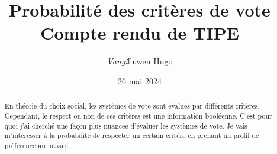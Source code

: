 \documentclass[french,11pt,a4paper]{article}
\title{Probabilité des critères de vote \\ Compte rendu de TIPE}
\author{\textit{Vangi}lluwen Hugo}
\date{26 mai 2024}
\theoremstyle{definition}
\theoremstyle{plain}
\theoremstyle{remark}
\begin{document}
	\maketitle

	\begin{abstract}
		En théorie du choix social, les systèmes de vote sont évalués par différents critères. Cependant, le respect ou non de ces critères est une information booléenne. C'est pour quoi j'ai cherché une façon plus nuancée d'évaluer les systèmes de vote. Je vais m'intéresser à la probabilité de respecter un certain critère en prenant un profil de préférence au hasard.
	\end{abstract}

	\tableofcontents

	

	

	

	

	

	

	
	
\end{document}
